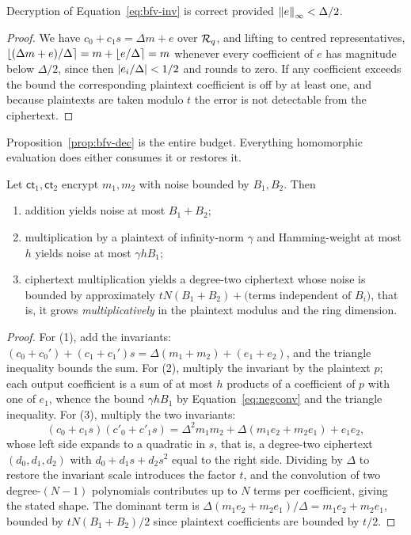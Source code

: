 \begin{proposition}
\label{prop:bfv-dec}
Decryption of Equation~\eqref{eq:bfv-inv} is correct provided
$\left\lVert e \right\rVert_\infty < \Delta/2$.
\end{proposition}

\begin{proof}
We have $c_0 + c_1 s = \Delta m + e$ over $\mathcal{R}_q$, and lifting to centred
representatives, $\left\lfloor (\Delta m + e)/\Delta \right\rceil = m + \left\lfloor e/\Delta \right\rceil = m$ whenever
every coefficient of $e$ has magnitude below $\Delta/2$, since then
$\left\lvert e_i/\Delta \right\rvert < 1/2$ and rounds to zero. If any coefficient exceeds the bound
the corresponding plaintext coefficient is off by at least one, and because
plaintexts are taken modulo $t$ the error is not detectable from the ciphertext.
\end{proof}

Proposition~\ref{prop:bfv-dec} is the entire budget. Everything homomorphic
evaluation does either consumes it or restores it.

\begin{proposition}
\label{prop:noise-growth}
Let $\mathsf{ct}_1,\mathsf{ct}_2$ encrypt $m_1,m_2$ with noise bounded by
$B_1,B_2$. Then
\begin{enumerate}
  \item addition yields noise at most $B_1+B_2$;
  \item multiplication by a plaintext of infinity-norm $\gamma$ and Hamming-weight
  at most $h$ yields noise at most $\gamma h B_1$;
  \item ciphertext multiplication yields a degree-two ciphertext whose noise is
  bounded by approximately $t N (B_1 + B_2) + \text{(terms independent of } B_i)$,
  that is, it grows \emph{multiplicatively} in the plaintext modulus and the ring
  dimension.
\end{enumerate}
\end{proposition}

\begin{proof}
For (1), add the invariants: $(c_0+c_0') + (c_1+c_1')s = \Delta(m_1+m_2) + (e_1+e_2)$,
and the triangle inequality bounds the sum. For (2), multiply the invariant by the
plaintext $p$; each output coefficient is a sum of at most $h$ products of a
coefficient of $p$ with one of $e_1$, whence the bound $\gamma h B_1$ by
Equation~\eqref{eq:negconv} and the triangle inequality. For (3), multiply the two
invariants:
\[
  (c_0 + c_1 s)(c'_0 + c'_1 s) = \Delta^2 m_1 m_2 + \Delta(m_1 e_2 + m_2 e_1) +
  e_1 e_2 ,
\]
whose left side expands to a quadratic in $s$, that is, a degree-two ciphertext
$(d_0,d_1,d_2)$ with $d_0 + d_1 s + d_2 s^2$ equal to the right side. Dividing by
$\Delta$ to restore the invariant scale introduces the factor $t$, and the
convolution of two degree-$(N-1)$ polynomials contributes up to $N$ terms per
coefficient, giving the stated shape. The dominant term is
$\Delta(m_1e_2 + m_2e_1)/\Delta = m_1e_2+m_2e_1$, bounded by $tN(B_1+B_2)/2$ since
plaintext coefficients are bounded by $t/2$.
\end{proof}

